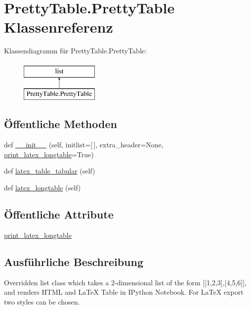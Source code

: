 \hypertarget{class_pretty_table_1_1_pretty_table}{}\section{Pretty\+Table.\+Pretty\+Table Klassenreferenz}
\label{class_pretty_table_1_1_pretty_table}
Klassendiagramm für Pretty\+Table.\+Pretty\+Table\+:\begin{figure}[H]
\begin{center}
\leavevmode
\includegraphics[height=2.000000cm]{class_pretty_table_1_1_pretty_table}
\end{center}
\end{figure}
\subsection*{Öffentliche Methoden}
\begin{DoxyCompactItemize}
\item 
def \mbox{\hyperlink{class_pretty_table_1_1_pretty_table_ab55e014c286d85c331f9df095008a6a2}{\+\_\+\+\_\+init\+\_\+\+\_\+}} (self, initlist=\mbox{[}$\,$\mbox{]}, extra\+\_\+header=None, \mbox{\hyperlink{class_pretty_table_1_1_pretty_table_a871a7b01d3f42d1a0e053a2cd1a98dbc}{print\+\_\+latex\+\_\+longtable}}=True)
\item 
def \mbox{\hyperlink{class_pretty_table_1_1_pretty_table_a47ca8c24fce0d42d04f689931f01ba3a}{latex\+\_\+table\+\_\+tabular}} (self)
\item 
def \mbox{\hyperlink{class_pretty_table_1_1_pretty_table_a2a1c5a4e3ffdd78cb58b17c492a9da39}{latex\+\_\+longtable}} (self)
\end{DoxyCompactItemize}
\subsection*{Öffentliche Attribute}
\begin{DoxyCompactItemize}
\item 
\mbox{\hyperlink{class_pretty_table_1_1_pretty_table_a871a7b01d3f42d1a0e053a2cd1a98dbc}{print\+\_\+latex\+\_\+longtable}}
\end{DoxyCompactItemize}


\subsection{Ausführliche Beschreibung}
\begin{DoxyVerb}Overridden list class which takes a 2-dimensional list of 
    the form [[1,2,3],[4,5,6]], and renders HTML and LaTeX Table in 
    IPython Notebook. For LaTeX export two styles can be chosen.\end{DoxyVerb}
 

